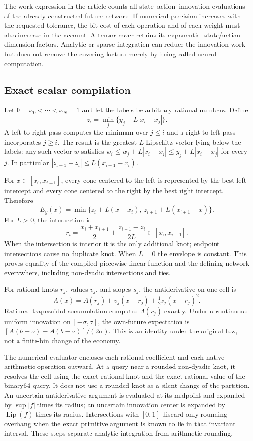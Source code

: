 The work expression in the article counts all state--action--innovation evaluations of the already constructed future network. If numerical precision increases with the requested tolerance, the bit cost of each operation and of each weight must also increase in the account. A tensor cover retains its exponential state/action dimension factors. Analytic or sparse integration can reduce the innovation work but does not remove the covering factors merely by being called neural computation.

\subsection{Exact scalar compilation}
Let $0=x_0<\cdots<x_N=1$ and let the labels be arbitrary rational numbers. Define
\[
 z_i=\min_j\{y_j+L|x_i-x_j|\}.
\]
A left-to-right pass computes the minimum over $j\le i$ and a right-to-left pass incorporates $j\ge i$. The result is the greatest $L$-Lipschitz vector lying below the labels: any such vector $w$ satisfies $w_i\le w_j+L|x_i-x_j|\le y_j+L|x_i-x_j|$ for every $j$. In particular $|z_{i+1}-z_i|\le L(x_{i+1}-x_i)$.

For $x\in[x_i,x_{i+1}]$, every cone centered to the left is represented by the best left intercept and every cone centered to the right by the best right intercept. Therefore
\[
 E_y(x)=\min\{z_i+L(x-x_i),\ z_{i+1}+L(x_{i+1}-x)\}.
\]
For $L>0$, the intersection is
\[
 r_i=\frac{x_i+x_{i+1}}2+\frac{z_{i+1}-z_i}{2L}\in[x_i,x_{i+1}].
\]
When the intersection is interior it is the only additional knot; endpoint intersections cause no duplicate knot. When $L=0$ the envelope is constant. This proves equality of the compiled piecewise-linear function and the defining network everywhere, including non-dyadic intersections and ties.

For rational knots $r_j$, values $v_j$, and slopes $s_j$, the antiderivative on one cell is
\[
 A(x)=A(r_j)+v_j(x-r_j)+\tfrac12s_j(x-r_j)^2.
\]
Rational trapezoidal accumulation computes $A(r_j)$ exactly. Under a continuous uniform innovation on $[-\sigma,\sigma]$, the own-future expectation is
$[A(b+\sigma)-A(b-\sigma)]/(2\sigma)$.
This is an identity under the original law, not a finite-bin change of the economy.

The numerical evaluator encloses each rational coefficient and each native arithmetic operation outward. At a query near a rounded non-dyadic knot, it resolves the cell using the exact rational knot and the exact rational value of the binary64 query. It does not use a rounded knot as a silent change of the partition. An uncertain antiderivative argument is evaluated at its midpoint and expanded by $\sup|f|$ times its radius; an uncertain innovation center is expanded by $\operatorname{Lip}(f)$ times its radius. Intersections with $[0,1]$ discard only rounding overhang when the exact primitive argument is known to lie in that invariant interval. These steps separate analytic integration from arithmetic rounding.

